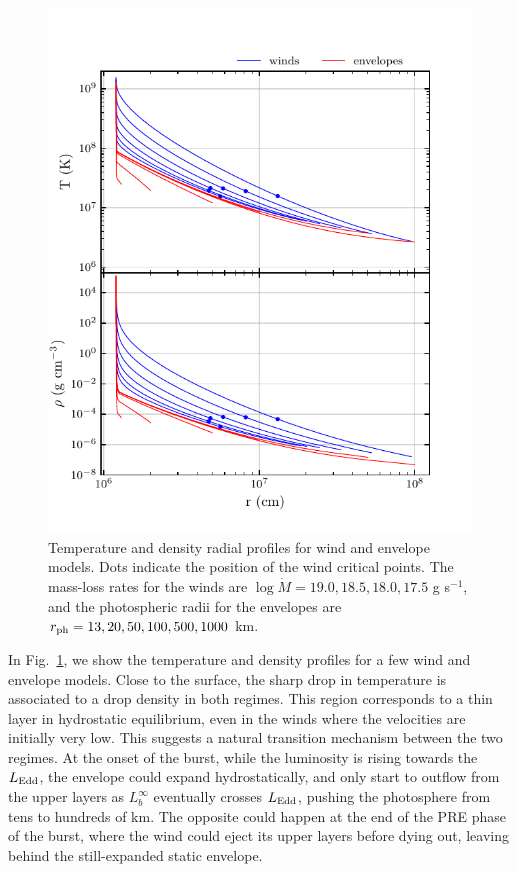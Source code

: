 \documentclass[../main.tex]{subfiles}
\begin{document}
\begin{figure}[htb!]
    \centering
    \includegraphics{figures/profiles.pdf}
    \caption[Radial profiles of winds and envelopes]{Temperature and density radial profiles for wind and envelope models.  Dots indicate the position of the wind critical points.  The mass-loss rates for the winds are $\log\dot{M}=19.0,18.5,18.0,17.5$  g s$^{-1}$, and the photospheric radii for the envelopes are $r_\text{ph}=13,20,50,100,500,1000$ km.}
    \label{fig:radial_profiles}
\end{figure}

In Fig.~\ref{fig:radial_profiles}, we show the temperature and density profiles for a few wind and envelope models.  Close to the surface, the sharp drop in temperature is associated to a drop density in both regimes. This region corresponds to a thin layer in hydrostatic equilibrium, even in the winds where the velocities are initially very low. This suggests a natural transition mechanism between the two regimes. At the onset of the burst, while the luminosity is rising towards the $L_\text{Edd}$, the envelope could expand hydrostatically, and only start to outflow from the upper layers as $L_b
^\infty$ eventually crosses $L_\text{Edd}$, pushing the photosphere from tens to hundreds of km. The opposite could happen at the end of the PRE phase of the burst, where the wind could eject its upper layers before dying out, leaving behind the still-expanded static envelope. 
\end{document}
